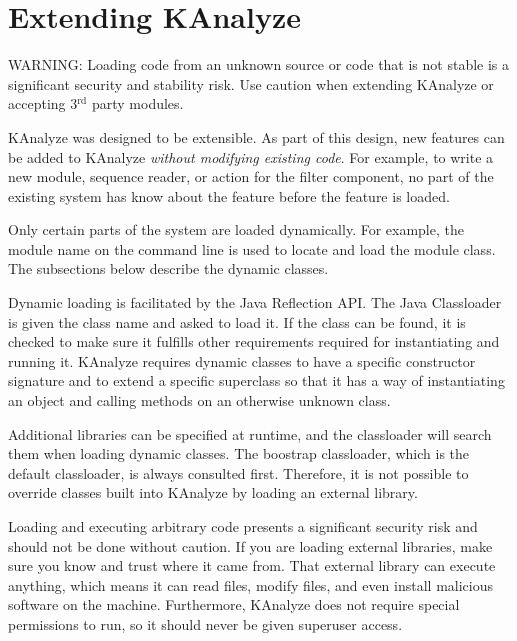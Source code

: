 
\section{Extending KAnalyze}
\label{sec.ext}

WARNING: Loading code from an unknown source or code that is not stable is a significant security and stability risk. Use caution when extending KAnalyze or accepting 3$^{\mathrm{rd}}$ party modules.

KAnalyze was designed to be extensible. As part of this design, new features can be added to KAnalyze \emph{without modifying existing code}. For example, to write a new module, sequence reader, or action for the filter component, no part of the existing system has know about the feature before the feature is loaded.

Only certain parts of the system are loaded dynamically. For example, the module name on the command line is used to locate and load the module class. The subsections below describe the dynamic classes.

Dynamic loading is facilitated by the Java Reflection API. The Java Classloader is given the class name and asked to load it. If the class can be found, it is checked to make sure it fulfills other requirements required for instantiating and running it. KAnalyze requires dynamic classes to have a specific constructor signature and to extend a specific superclass so that it has a way of instantiating an object and calling methods on an otherwise unknown class.

Additional libraries can be specified at runtime, and the classloader will search them when loading dynamic classes. The boostrap classloader, which is the default classloader, is always consulted first. Therefore, it is not possible to override classes built into KAnalyze by loading an external library.

Loading and executing arbitrary code presents a significant security risk and should not be done without caution. If you are loading external libraries, make sure you know and trust where it came from. That external library can execute anything, which means it can read files, modify files, and even install malicious software on the machine. Furthermore, KAnalyze does not require special permissions to run, so it should never be given superuser access.



